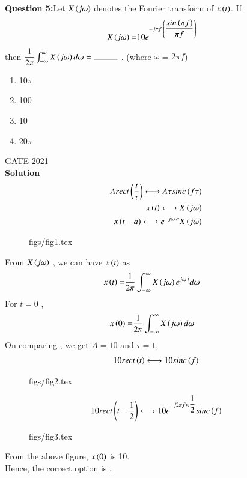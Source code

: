 \documentclass[journal,12pt,twocolumn]{IEEEtran}
\theoremstyle{remark}
\begin{document}
%
\textbf{Question 5:}Let $X\left(j \omega\right)$ denotes the Fourier transform of $x\left(t\right)$. If 
\begin{align}
X\left(j \omega\right) =& 10e^{-j\pi f \: \left(\dfrac{sin\left(\pi f\right)}{\pi f}\right)}
\end{align} 
then $ \dfrac{1}{2\pi} \int_{-\infty }^{\infty} X\brak{j \omega} d\omega = \rule{1cm}{0.15mm}$ .  (where $\omega$ = $2\pi f$)\\
\begin{enumerate}[label = \brak{\Alph*}]
\item 10$\pi$ \\
\item 100 \\
\item 10 \\
\item 20$\pi$ 
\end{enumerate}
\hfill GATE 2021\\
\textbf{Solution}  
\begin{align}
\label{eq : 2}A rect \left(\dfrac{t}{\tau}\right) \longleftrightarrow A \tau sinc\left(f\tau\right) \\
\label{eq : 3}x\left(t\right) \longleftrightarrow  X\left(j \omega\right) \\
\label{eq : 4}x\left(t-a\right) \longleftrightarrow e^{-j \omega \: a}X\left(j \omega\right)
\end{align}
\begin{figure}[ht]
	\centering
     {figs/fig1.tex}
    \label{fig: 1}
    \caption{}
\end{figure}

From $X\left(j \omega\right)$ , we can have $x\left(t\right)$ as
\begin{align}
x\left(t\right) =& \dfrac{1}{2\pi} \int_{-\infty }^{\infty} X\left(j \omega\right) e^{j \omega \: t} d\omega
\end{align}
For $t=0$ ,
\begin{align}
x\left(0\right) =& \dfrac{1}{2\pi} \int_{-\infty }^{\infty} X\left(j \omega\right) d\omega
\end{align}
On comparing , we get $A = 10$ and $ \tau = 1$,
\begin{align}
10 rect \left(t\right) \longleftrightarrow 10  sinc\left(f\right) 
\end{align}
\begin{figure}[ht]
	\centering
     {figs/fig2.tex}
    \label{fig: 2}
    \caption{}
\end{figure}
\begin{align}
10 rect \left(t-\dfrac{1}{2}\right) \longleftrightarrow 10e^{-j2\pi f \times \dfrac{1}{2}}sinc \left(f\right)
\end{align}
\begin{figure}[ht]
	\centering
     {figs/fig3.tex}
    \label{fig: 3}
    \caption{}
\end{figure}

From the above figure, $x\left(0\right)$ is 10.\\
Hence, the correct option is .
\end{document}
